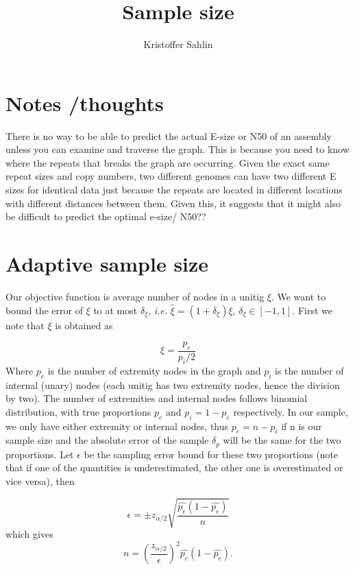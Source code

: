 \documentclass[a4paper,6pt]{article}
\begin{document}
\title{Sample size} 
\author{Kristoffer Sahlin}
\date{} %
\maketitle

\section{Notes /thoughts}
There is no way to be able to predict the actual E-size or N50 of an assembly unless you can examine and traverse the graph. This is because you need to know where the repeats that breaks the graph are occurring. Given the exact same repeat sizes and copy numbers, two different genomes can have two different E sizes for identical data just because the repeats are located in different locations with different distances between them. Given this, it suggests that it might also be difficult to predict the optimal e-size/ N50?? 

\section{Adaptive sample size}
Our objective function is average number of nodes in a unitig $\xi$. We want to bound the error of $\xi$ to at most $\delta_{\xi}$, \emph{i.e.} $\hat{\xi} = (1 + \delta_{\xi})\xi$, $\delta_{\xi}\in [-1,1]$. First we note that $\xi$ is obtained as 

\begin{equation}
\xi = \frac{p_e}{p_i/2}
\end{equation}
Where $p_e$ is the number of extremity nodes in the graph and $p_i$ is the number of internal (unary) nodes (each unitig has two extremity nodes, hence the division by two). The number of extremities and internal nodes follows binomial distribution, with true proportions $p_e$ and $p_i= 1-p_e$ respectively. In our sample, we only have either extremity or internal nodes, thus $p_e = n - p_i$ if n is our sample size and the absolute error of the sample $\delta_p$ will be the same for the two proportions. Let $\epsilon$ be the sampling error bound for these two proportions (note that if one of the quantities is underestimated, the other one is overestimated or vice versa), then

\begin{equation}
\epsilon = \pm z_{\alpha/2}\sqrt{\frac{\hat{p_e}(1 - \hat{p_e})}{n}}
\end{equation}  
which gives
\begin{equation}
n = (\frac{z_{\alpha/2}}{\epsilon})^2\hat{p_e}(1 - \hat{p_e}).
\end{equation}  
\end{document}
